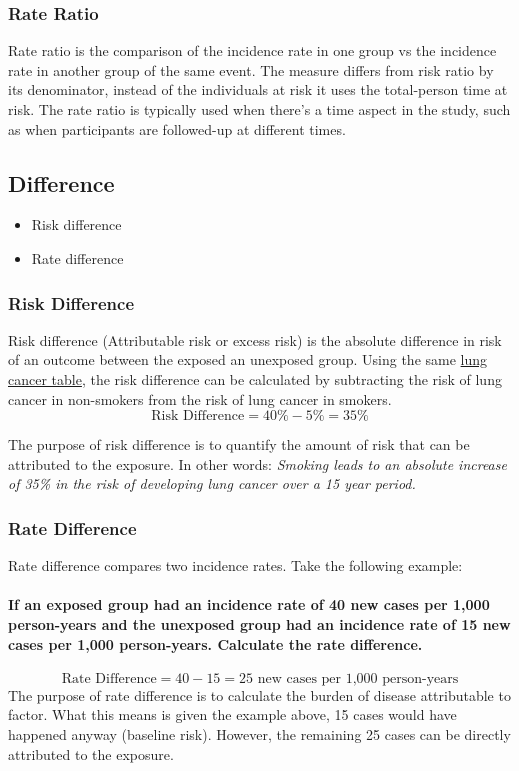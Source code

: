 \documentclass{article}
\begin{document}
\subsubsection{Rate Ratio}
Rate ratio is the comparison of the incidence rate in one group vs the incidence rate in another group
of the same event. The measure differs from risk ratio by its denominator, instead of the individuals at risk
it uses the total-person time at risk. The rate ratio is typically used when there's a time aspect in the study,
such as when participants are followed-up at different times.



\subsection{Difference}
\begin{itemize}
    \item Risk difference
    \item Rate difference
\end{itemize}

\subsubsection{Risk Difference}
Risk difference (Attributable risk or excess risk) is the absolute difference in risk of an outcome
between the exposed an unexposed group. Using the same \hyperref[tab:lung-cancer]{lung cancer table},
the risk difference can be calculated by subtracting the risk of lung cancer in non-smokers from the
risk of lung cancer in smokers.
\begin{equation*}
    \text{Risk Difference} = 40\% - 5\% = 35\%
\end{equation*}

The purpose of risk difference is to quantify the amount of risk that can be attributed to the exposure.
In other words: \textit{Smoking leads to an absolute increase of 35\% in the risk of developing
lung cancer over a 15 year period.}


\subsubsection{Rate Difference}
Rate difference compares two incidence rates. Take the following example:

\paragraph{If an exposed group had an incidence rate of 40 new cases per 1,000 person-years and the
unexposed group had an incidence rate of 15 new cases per 1,000 person-years. Calculate the rate difference.}
\begin{equation*}
    \text{Rate Difference} = 40 - 15 = 25 \text{ new cases per 1,000 person-years}
\end{equation*}
The purpose of rate difference is to calculate the burden of disease attributable to factor. What this means is
given the example above, 15 cases would have happened anyway (baseline risk). However, the remaining 25 cases
can be directly attributed to the exposure.
\end{document}

